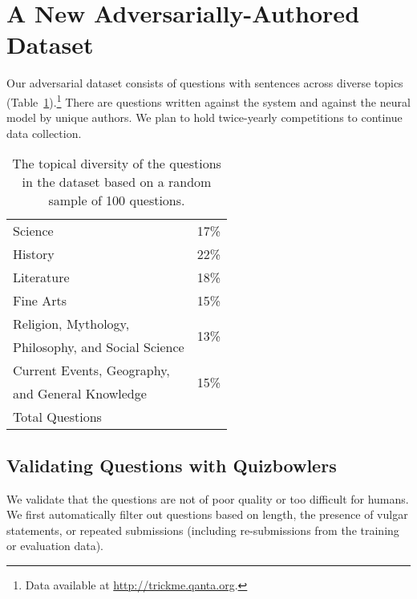 \section{A New Adversarially-Authored Dataset}\label{sec:human}

Our adversarial dataset consists of \ntotalquestions{} questions with
\ntotalsentences{} sentences across diverse topics (Table~\ref{table:categories}).\footnote{Data available at \url{http://trickme.qanta.org}.} There are \ntotalIR{} questions  
written against the  system and \ntotalNeural{} against the
neural model by \ntotalwriters{} unique authors.
We plan to hold twice-yearly competitions
to continue data collection.

\begin{table}
\centering \small
\begin{tabular}{lr}
\toprule
Science                        & 17\%                  \\
History                        & 22\%                  \\
Literature                     & 18\%                  \\
Fine Arts                      & 15\%                  \\
Religion, Mythology,           & \multirow{2}{*}{13\%} \\
Philosophy, and Social Science &                       \\
Current Events, Geography,     & \multirow{2}{*}{15\%} \\
and General Knowledge          &                       \\
\midrule
Total Questions & \ntotalquestions{} \\
\bottomrule
\end{tabular}
\caption{The topical diversity of the questions in the \challenge{}
  dataset based on a random sample of 100 questions.}
\label{table:categories}
\end{table}

\subsection{Validating Questions with Quizbowlers}
\label{sec:validation}

We validate that the \challenge{} questions are not of poor quality or too difficult for humans. 
We first automatically filter out questions based on
length, the presence of vulgar statements, or repeated submissions
(including re-submissions from the \qb{} training or evaluation
data). 

